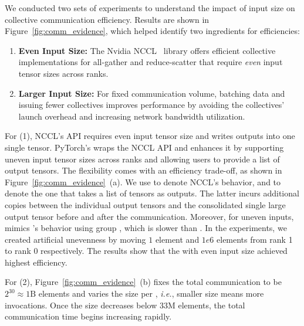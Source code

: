 We conducted two sets of experiments to understand the impact of input size on collective communication efficiency. Results are shown in Figure~\ref{fig:comm_evidence}, which helped identify two ingredients for efficiencies:
\begin{enumerate}
    \item \textbf{Even Input Size:} The Nvidia NCCL~\cite{nccl} library offers efficient collective implementations for all-gather and reduce-scatter that require \emph{even} input tensor sizes across ranks.
    \item \textbf{Larger Input Size:} For fixed communication volume, batching data and issuing fewer collectives improves performance by avoiding the collectives' launch overhead and increasing network bandwidth utilization.
\end{enumerate}

For (1), NCCL's  API requires even input tensor size and writes outputs into one single tensor. PyTorch's  wraps the NCCL API and enhances it by supporting uneven input tensor sizes across ranks and allowing users to provide a list of output tensors. The flexibility comes with an efficiency trade-off, as shown in Figure~\ref{fig:comm_evidence}~(a). We use  to denote NCCL's  behavior, and  to denote the one that takes a list of tensors as outputs. The latter incurs additional copies between the individual output tensors and the consolidated single large output tensor before and after the communication. Moreover, for uneven inputs,  mimics 's behavior using group , which is slower than . In the experiments, we created artificial unevenness by moving $1$ element and $1e6$ elements from rank 1 to rank 0 respectively. The results show that the  with even input size achieved highest efficiency. 

For (2), Figure~\ref{fig:comm_evidence}~(b) fixes the total communication to be $2^{30} \approx 1\text{B}$  elements and varies the size per , \emph{i.e.}, smaller  size means more  invocations. Once the  size decreases below $33\text{M}$ elements, the total communication time begins increasing rapidly.

